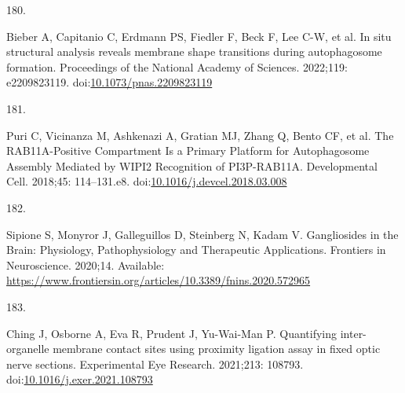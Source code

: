 \documentclass[
  12pt,
  a4paper,
]{book}
\newlength{\cslhangindent}
\newlength{\csllabelwidth}
\newenvironment{CSLReferences}[2] %
 {\begin{list}{}{%
  \setlength{\itemindent}{0pt}
  \setlength{\leftmargin}{0pt}
  \setlength{\parsep}{0pt}
  \ifodd #1
   \setlength{\leftmargin}{\cslhangindent}
   \setlength{\itemindent}{-1\cslhangindent}
  \fi
  \setlength{\itemsep}{#2\baselineskip}}}
 {\end{list}}
\newcommand{\CSLLeftMargin}[1]{\parbox[t]{\csllabelwidth}{\strut#1\strut}}
\newcommand{\CSLRightInline}[1]{\parbox[t]{\linewidth - \csllabelwidth}{\strut#1\strut}}
\begin{document}
\begin{CSLReferences}{0}{1}
\CSLLeftMargin{180. }%
\CSLRightInline{Bieber A, Capitanio C, Erdmann PS, Fiedler F, Beck F, Lee C-W, et al. In situ structural analysis reveals membrane shape transitions during autophagosome formation. Proceedings of the National Academy of Sciences. 2022;119: e2209823119. doi:\href{https://doi.org/10.1073/pnas.2209823119}{10.1073/pnas.2209823119}}

\CSLLeftMargin{181. }%
\CSLRightInline{Puri C, Vicinanza M, Ashkenazi A, Gratian MJ, Zhang Q, Bento CF, et al. The {RAB11A-Positive Compartment Is} a {Primary Platform} for {Autophagosome Assembly Mediated} by {WIPI2 Recognition} of {PI3P-RAB11A}. Developmental Cell. 2018;45: 114--131.e8. doi:\href{https://doi.org/10.1016/j.devcel.2018.03.008}{10.1016/j.devcel.2018.03.008}}

\CSLLeftMargin{182. }%
\CSLRightInline{Sipione S, Monyror J, Galleguillos D, Steinberg N, Kadam V. Gangliosides in the {Brain}: {Physiology}, {Pathophysiology} and {Therapeutic Applications}. Frontiers in Neuroscience. 2020;14. Available: \url{https://www.frontiersin.org/articles/10.3389/fnins.2020.572965}}

\CSLLeftMargin{183. }%
\CSLRightInline{Ching J, Osborne A, Eva R, Prudent J, Yu-Wai-Man P. Quantifying inter-organelle membrane contact sites using proximity ligation assay in fixed optic nerve sections. Experimental Eye Research. 2021;213: 108793. doi:\href{https://doi.org/10.1016/j.exer.2021.108793}{10.1016/j.exer.2021.108793}}

\end{CSLReferences}
\end{document}
